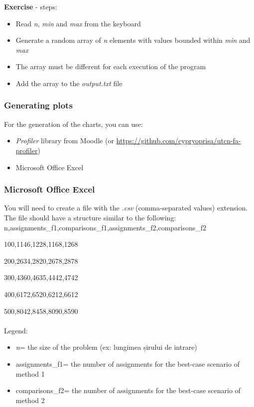 \documentclass[../en-fa-lab.tex]{subfiles}
\begin{document}
\textbf{Exercise} - steps:

\begin{itemize}
\item
  Read \emph{n}, \emph{min} and \emph{max} from the keyboard
\item
  Generate a random array of \emph{n} elements with values bounded
  within \emph{min} and \emph{max}
\item
  The array must be different for each execution of the program
\item
  Add the array to the \emph{output.txt} file
\end{itemize}

\subsubsection{Generating plots}\label{generare-grafice}

For the generation of the charts, you can use:

\begin{itemize}
\item
  \emph{Profiler} library from Moodle (or
  \url{https://github.com/cypryoprisa/utcn-fa-profiler})
\item
  Microsoft Office Excel
\end{itemize}

\subsubsection{Microsoft Office Excel}\label{microsoft-office-excel}

You will need to create a file with the \emph{.csv} (comma-separated
values) extension. The file should have a structure similar to the
following:\\

n,assignments\_f1,comparisons\_f1,assignments\_f2,comparisons\_f2

100,1146,1228,1168,1268

200,2634,2820,2678,2878

300,4360,4635,4442,4742

400,6172,6520,6212,6612

500,8042,8458,8090,8590
\\\\
Legend:

\begin{itemize}
\item
  \emph{n}= the size of the problem (ex: lungimea șirului de intrare)
\item
  assignments\_f1= the number of assignments for the best-case scenario
  of method 1
\item
  comparisons\_f2= the number of assignments for the best-case scenario
  of method 2
\end{itemize}
\end{document}
